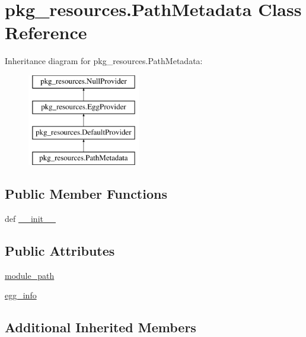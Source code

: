 \hypertarget{classpkg__resources_1_1PathMetadata}{}\section{pkg\+\_\+resources.\+Path\+Metadata Class Reference}
\label{classpkg__resources_1_1PathMetadata}
Inheritance diagram for pkg\+\_\+resources.\+Path\+Metadata\+:\begin{figure}[H]
\begin{center}
\leavevmode
\includegraphics[height=4.000000cm]{classpkg__resources_1_1PathMetadata}
\end{center}
\end{figure}
\subsection*{Public Member Functions}
\begin{DoxyCompactItemize}
\item 
def \hyperlink{classpkg__resources_1_1PathMetadata_a4f0983baf0ffd69e538f68a119d3bdeb}{\+\_\+\+\_\+init\+\_\+\+\_\+}
\end{DoxyCompactItemize}
\subsection*{Public Attributes}
\begin{DoxyCompactItemize}
\item 
\hyperlink{classpkg__resources_1_1PathMetadata_a32d4f91934149b639e6b3e88e802bd9f}{module\+\_\+path}
\item 
\hyperlink{classpkg__resources_1_1PathMetadata_a61a445362a417dfb470ebee020a73762}{egg\+\_\+info}
\end{DoxyCompactItemize}
\subsection*{Additional Inherited Members}


